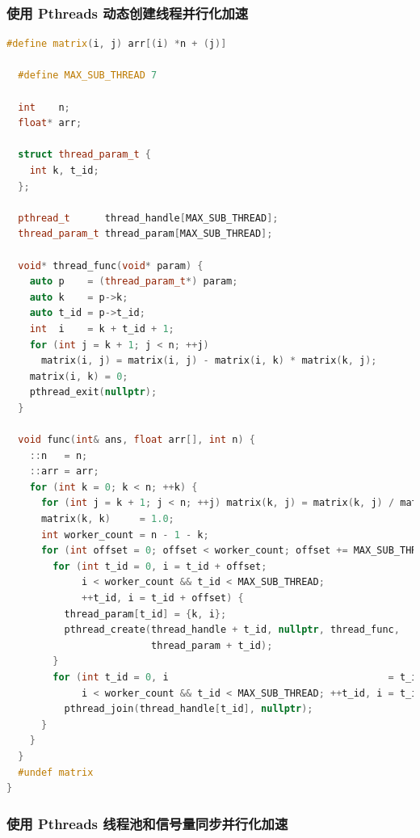 \documentclass[a4paper]{article}
\begin{document}
\subsubsection{使用 Pthreads 动态创建线程并行化加速}

\begin{lstlisting}[title=动态创建线程frame=trbl,language={C++}]
  #define matrix(i, j) arr[(i) *n + (j)]

  #define MAX_SUB_THREAD 7
  
  int    n;
  float* arr;
  
  struct thread_param_t {
    int k, t_id;
  };
  
  pthread_t      thread_handle[MAX_SUB_THREAD];
  thread_param_t thread_param[MAX_SUB_THREAD];
  
  void* thread_func(void* param) {
    auto p    = (thread_param_t*) param;
    auto k    = p->k;
    auto t_id = p->t_id;
    int  i    = k + t_id + 1;
    for (int j = k + 1; j < n; ++j)
      matrix(i, j) = matrix(i, j) - matrix(i, k) * matrix(k, j);
    matrix(i, k) = 0;
    pthread_exit(nullptr);
  }
  
  void func(int& ans, float arr[], int n) {
    ::n   = n;
    ::arr = arr;
    for (int k = 0; k < n; ++k) {
      for (int j = k + 1; j < n; ++j) matrix(k, j) = matrix(k, j) / matrix(k, k);
      matrix(k, k)     = 1.0;
      int worker_count = n - 1 - k;
      for (int offset = 0; offset < worker_count; offset += MAX_SUB_THREAD) {
        for (int t_id = 0, i = t_id + offset;
             i < worker_count && t_id < MAX_SUB_THREAD;
             ++t_id, i = t_id + offset) {
          thread_param[t_id] = {k, i};
          pthread_create(thread_handle + t_id, nullptr, thread_func,
                         thread_param + t_id);
        }
        for (int t_id = 0, i                                      = t_id + offset;
             i < worker_count && t_id < MAX_SUB_THREAD; ++t_id, i = t_id + offset)
          pthread_join(thread_handle[t_id], nullptr);
      }
    }
  }
  #undef matrix
}
\end{lstlisting}

\subsubsection{使用 Pthreads 线程池和信号量同步并行化加速}
\end{document}
